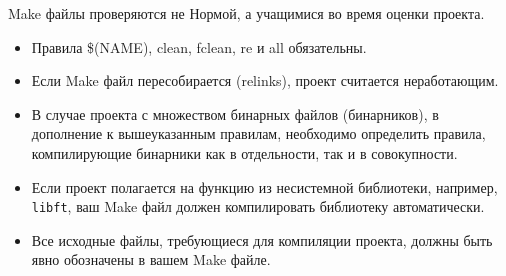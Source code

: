 \documentclass{42-ru}
\begin{document}
            Make файлы проверяются не Нормой, а учащимися во время оценки проекта.
            \begin{itemize}

                \item Правила \$(NAME), clean, fclean, re и all обязательны.

                \item Если Make файл пересобирается (relinks), проект считается неработающим.

                \item В случае проекта с множеством бинарных файлов (бинарников), в дополнение к вышеуказанным правилам, необходимо определить правила, компилирующие бинарники как в отдельности, так и в совокупности.

                \item Если проект полагается на функцию из несистемной библиотеки, например, \texttt{libft}, ваш Make файл должен компилировать библиотеку автоматически.

                \item Все исходные файлы, требующиеся для компиляции проекта, должны быть явно обозначены в вашем Make файле.

            \end{itemize}
\end{document}
